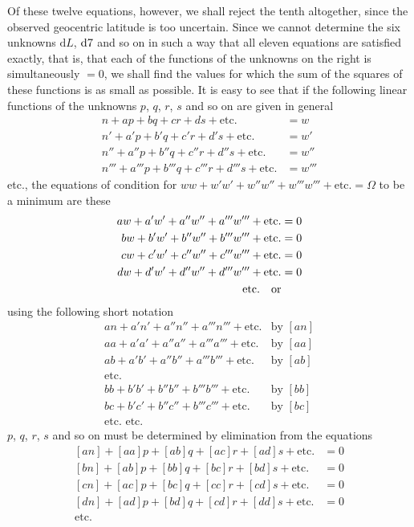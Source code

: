 Of these twelve equations, however, we shall reject the tenth altogether, since the observed geocentric latitude is too uncertain.
\SourceGathering{3\textsuperscript{*}}
Since we cannot determine the six unknowns $\mathrm dL$, $\mathrm d\mathord{7}$ and so on in such a way that all eleven equations are satisfied exactly, that is, that each of the functions of the unknowns on the right is simultaneously $=0$, we shall find the values for which the sum of the squares of these functions is as small as possible. It is easy to see that if the following linear functions of the unknowns $p$, $q$, $r$, $s$ and so on are given in general
\[
\begin{aligned}
n+ap+bq+cr+ds+\text{etc.}&=w\\
n'+a'p+b'q+c'r+d's+\text{etc.}&=w'\\
n''+a''p+b''q+c''r+d''s+\text{etc.}&=w''\\
n'''+a'''p+b'''q+c'''r+d'''s+\text{etc.}&=w'''
\end{aligned}
\]
etc., the equations of condition for $ww+w'w'+w''w''+w'''w'''+\text{etc.}=\Omega$ to be a minimum are these
\[
\begin{aligned}
aw+a'w'+a''w''+a'''w'''+\text{etc.}&=0\\
bw+b'w'+b''w''+b'''w'''+\text{etc.}&=0\\
cw+c'w'+c''w''+c'''w'''+\text{etc.}&=0\\
dw+d'w'+d''w''+d'''w'''+\text{etc.}&=0\\
\text{etc.\quad or}&
\end{aligned}
\]
using the following short notation
\[
\begin{array}{ll}
an+a'n'+a''n''+a'''n'''+\text{etc.}&\text{by }[an]\\
aa+a'a'+a''a''+a'''a'''+\text{etc.}&\text{by }[aa]\\
ab+a'b'+a''b''+a'''b'''+\text{etc.}&\text{by }[ab]\\
\text{etc.}&\\
bb+b'b'+b''b''+b'''b'''+\text{etc.}&\text{by }[bb]\\
bc+b'c'+b''c''+b'''c'''+\text{etc.}&\text{by }[bc]\\
\text{etc. etc.}&
\end{array}
\]
$p$, $q$, $r$, $s$ and so on must be determined by elimination from the equations
\[
\begin{aligned}{}
{[an]}+[aa]p+[ab]q+[ac]r+[ad]s+\text{etc.}&=0\\
{[bn]}+[ab]p+[bb]q+[bc]r+[bd]s+\text{etc.}&=0\\
{[cn]}+[ac]p+[bc]q+[cc]r+[cd]s+\text{etc.}&=0\\
{[dn]}+[ad]p+[bd]q+[cd]r+[dd]s+\text{etc.}&=0\\
\text{etc.}&
\end{aligned}
\]
